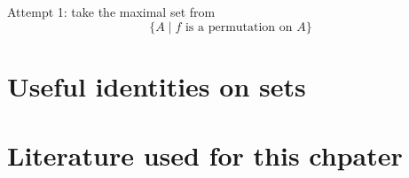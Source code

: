 Attempt 1: take the maximal set from
\[
    \{ A \mid f \text{ is a permutation on } A \}
\]

\section{Useful identities on sets}


\section{Literature used for this chpater}
